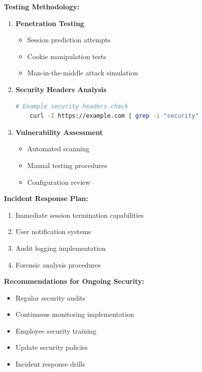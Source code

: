 \documentclass[12pt]{article}
\begin{document}
\textbf{Testing Methodology:}
\begin{enumerate}
    \item \textbf{Penetration Testing}
    \begin{itemize}
        \item Session prediction attempts
        \item Cookie manipulation tests
        \item Man-in-the-middle attack simulation
    \end{itemize}

    \item \textbf{Security Headers Analysis}
    \begin{lstlisting}[language=bash]
    # Example security headers check
    curl -I https://example.com | grep -i "security"
    \end{lstlisting}

    \item \textbf{Vulnerability Assessment}
    \begin{itemize}
        \item Automated scanning
        \item Manual testing procedures
        \item Configuration review
    \end{itemize}
\end{enumerate}

\textbf{Incident Response Plan:}
\begin{enumerate}
    \item Immediate session termination capabilities
    \item User notification systems
    \item Audit logging implementation
    \item Forensic analysis procedures
\end{enumerate}

\textbf{Recommendations for Ongoing Security:}
\begin{itemize}
    \item Regular security audits
    \item Continuous monitoring implementation
    \item Employee security training
    \item Update security policies
    \item Incident response drills
\end{itemize}
\end{document}
